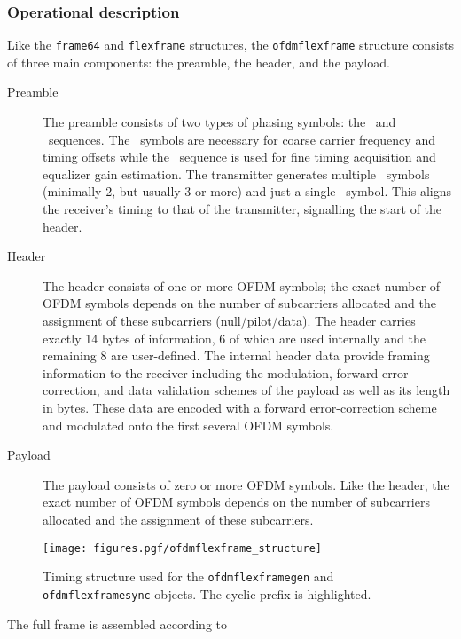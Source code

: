 \subsubsection{Operational description}
\label{module:framing:ofdmflexframe:operation}
Like the {\tt frame64} and {\tt flexframe} structures,
the {\tt ofdmflexframe} structure consists of three main components:
the preamble, the header, and the payload.
%    
\begin{description}
\item[Preamble]
    The preamble consists of two types of phasing symbols: the \Ss\ and
    \Sl\ sequences.
    The \Ss\ symbols are necessary for coarse carrier frequency
    and timing offsets while the \Sl\ sequence is used for fine timing
    acquisition and equalizer gain estimation.  The transmitter
    generates multiple \Ss\ symbols (minimally 2, but usually 3 or more)
    and just a single \Sl\ symbol. This aligns the receiver's timing to
    that of the transmitter, signalling the start of the header.
\item[Header]
    The header consists of one or more OFDM symbols; the exact number of
    OFDM symbols depends on the number of subcarriers allocated and the
    assignment of these subcarriers (null/pilot/data). The header
    carries exactly 14 bytes of information, 6 of which are used
    internally and the remaining 8 are user-defined.
    The internal header data provide framing information to the receiver
    including the modulation, forward error-correction, and
    data validation schemes of the payload as well as its length in
    bytes. These data are encoded with a forward error-correction scheme
    and modulated onto the first several OFDM symbols.
\item[Payload]
    The payload consists of zero or more OFDM symbols. Like the header,
    the exact number of OFDM symbols depends on the number of
    subcarriers allocated and the assignment of these subcarriers.
\end{description}
%
% 
%
\begin{figure}
\centering
  \texttt{[image: figures.pgf/ofdmflexframe\_structure]}
\caption{
    Timing structure used for the {\tt ofdmflexframegen} and
    {\tt ofdmflexframesync} objects.
    The cyclic prefix is highlighted.}
\label{fig:module:framing:ofdmflexframe_structure}
\end{figure}
%
The full frame is assembled according to
